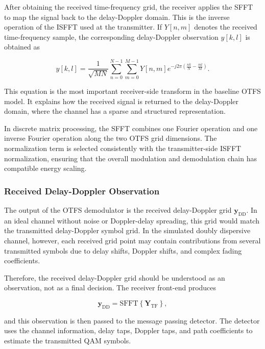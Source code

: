 After obtaining the received time-frequency grid, the receiver applies the SFFT to map the signal back to the delay-Doppler domain. This is the inverse operation of the ISFFT used at the transmitter. If \(Y[n,m]\) denotes the received time-frequency sample, the corresponding delay-Doppler observation \(y[k,l]\) is obtained as

\begin{equation}
    y[k,l]
    =
    \frac{1}{\sqrt{MN}}
    \sum_{n=0}^{N-1}
    \sum_{m=0}^{M-1}
    Y[n,m]
    e^{-j2\pi\left(\frac{nk}{N}-\frac{ml}{M}\right)} .
\end{equation}

This equation is the most important receiver-side transform in the baseline OTFS model. It explains how the received signal is returned to the delay-Doppler domain, where the channel has a sparse and structured representation.

In discrete matrix processing, the SFFT combines one Fourier operation and one inverse Fourier operation along the two OTFS grid dimensions. The normalization term is selected consistently with the transmitter-side ISFFT normalization, ensuring that the overall modulation and demodulation chain has compatible energy scaling.

\subsubsection{Received Delay-Doppler Observation}

The output of the OTFS demodulator is the received delay-Doppler grid \(\mathbf{y}_{\mathrm{DD}}\). In an ideal channel without noise or Doppler-delay spreading, this grid would match the transmitted delay-Doppler symbol grid. In the simulated doubly dispersive channel, however, each received grid point may contain contributions from several transmitted symbols due to delay shifts, Doppler shifts, and complex fading coefficients.

Therefore, the received delay-Doppler grid should be understood as an observation, not as a final decision. The receiver front-end produces

\begin{equation}
    \mathbf{y}_{\mathrm{DD}} = \mathrm{SFFT}\left\{\mathbf{Y}_{\mathrm{TF}}\right\},
\end{equation}

and this observation is then passed to the message passing detector. The detector uses the channel information, delay taps, Doppler taps, and path coefficients to estimate the transmitted QAM symbols.


